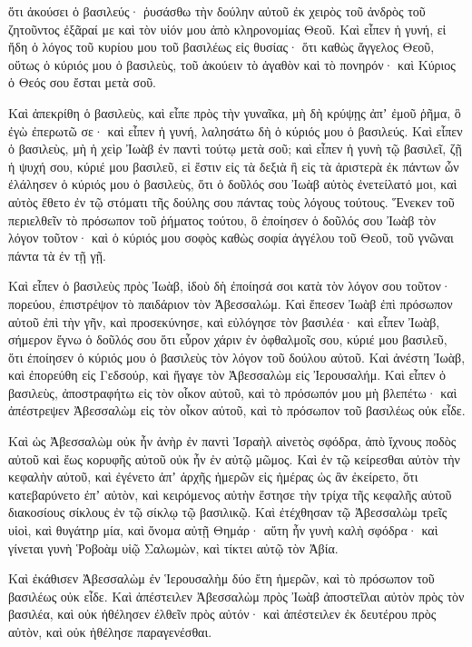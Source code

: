 {ὅτι ἀκούσει ὁ βασιλεύς· ῥυσάσθω τὴν δούλην αὐτοῦ ἐκ χειρὸς τοῦ ἀνδρὸς τοῦ ζητοῦντος ἐξᾶραί με καὶ τὸν υἱόν μου ἀπὸ κληρονομίας Θεοῦ.
Καὶ εἶπεν ἡ γυνή, εἰ ἤδη ὁ λόγος τοῦ κυρίου μου τοῦ βασιλέως εἰς θυσίας· ὅτι καθὼς ἄγγελος Θεοῦ, οὕτως ὁ κύριός μου ὁ βασιλεὺς, τοῦ ἀκούειν τὸ ἀγαθὸν καὶ τὸ πονηρόν· καὶ Κύριος ὁ Θεός σου ἔσται μετὰ σοῦ.
\par }{\PP {}Καὶ ἀπεκρίθη ὁ βασιλεὺς, καὶ εἶπε πρὸς τὴν γυναῖκα, μὴ δὴ κρύψῃς ἀπʼ ἐμοῦ ῥῆμα, ὃ ἐγὼ ἐπερωτῶ σε· καὶ εἶπεν ἡ γυνή, λαλησάτω δὴ ὁ κύριός μου ὁ βασιλεύς.
Καὶ εἶπεν ὁ βασιλεὺς, μὴ ἡ χεὶρ Ἰωὰβ ἐν παντὶ τούτῳ μετὰ σοῦ; καὶ εἶπεν ἡ γυνὴ τῷ βασιλεῖ, ζῇ ἡ ψυχή σου, κύριέ μου βασιλεῦ, εἰ ἔστιν εἰς τὰ δεξιὰ ἢ εἰς τὰ ἀριστερὰ ἐκ πάντων ὧν ἐλάλησεν ὁ κύριός μου ὁ βασιλεὺς, ὅτι ὁ δοῦλός σου Ἰωὰβ αὐτὸς ἐνετείλατό μοι, καὶ αὐτὸς ἔθετο ἐν τῷ στόματι τῆς δούλης σου πάντας τοὺς λόγους τούτους.
Ἕνεκεν τοῦ περιελθεῖν τὸ πρόσωπον τοῦ ῥήματος τούτου, ὃ ἐποίησεν ὁ δοῦλός σου Ἰωὰβ τὸν λόγον τοῦτον· καὶ ὁ κύριός μου σοφὸς καθὼς σοφία ἀγγέλου τοῦ Θεοῦ, τοῦ γνῶναι πάντα τὰ ἐν τῇ γῇ.
\par }{\PP {}Καὶ εἶπεν ὁ βασιλεὺς πρὸς Ἰωὰβ, ἰδοὺ δὴ ἐποίησά σοι κατὰ τὸν λόγον σου τοῦτον· πορεύου, ἐπιστρέψον τὸ παιδάριον τὸν Ἀβεσσαλώμ.
Καὶ ἔπεσεν Ἰωὰβ ἐπὶ πρόσωπον αὐτοῦ ἐπὶ τὴν γῆν, καὶ προσεκύνησε, καὶ εὐλόγησε τὸν βασιλέα· καὶ εἶπεν Ἰωὰβ, σήμερον ἔγνω ὁ δοῦλός σου ὅτι εὗρον χάριν ἐν ὀφθαλμοῖς σου, κύριέ μου βασιλεῦ, ὅτι ἐποίησεν ὁ κύριός μου ὁ βασιλεὺς τὸν λόγον τοῦ δούλου αὐτοῦ.
Καὶ ἀνέστη Ἰωὰβ, καὶ ἐπορεύθη εἰς Γεδσούρ, καὶ ἤγαγε τὸν Ἀβεσσαλὼμ εἰς Ἰερουσαλήμ.
Καὶ εἶπεν ὁ βασιλεὺς, ἀποστραφήτω εἰς τὸν οἶκον αὐτοῦ, καὶ τὸ πρόσωπόν μου μὴ βλεπέτω· καὶ ἀπέστρεψεν Ἀβεσσαλὼμ εἰς τὸν οἶκον αὐτοῦ, καὶ τὸ πρόσωπον τοῦ βασιλέως οὐκ εἶδε.
\par }{\PP {}Καὶ ὡς Ἀβεσσαλὼμ οὐκ ἦν ἀνὴρ ἐν παντὶ Ἰσραὴλ αἰνετὸς σφόδρα, ἀπὸ ἴχνους ποδὸς αὐτοῦ καὶ ἕως κορυφῆς αὐτοῦ οὐκ ἦν ἐν αὐτῷ μῶμος.
Καὶ ἐν τῷ κείρεσθαι αὐτὸν τὴν κεφαλὴν αὐτοῦ, καὶ ἐγένετο ἀπʼ ἀρχῆς ἡμερῶν εἰς ἡμέρας ὡς ἂν ἐκείρετο, ὅτι κατεβαρύνετο ἐπʼ αὐτὸν, καὶ κειρόμενος αὐτὴν ἔστησε τὴν τρίχα τῆς κεφαλῆς αὐτοῦ διακοσίους σίκλους ἐν τῷ σίκλῳ τῷ βασιλικῷ.
Καὶ ἐτέχθησαν τῷ Ἀβεσσαλὼμ τρεῖς υἱοὶ, καὶ θυγάτηρ μία, καὶ ὄνομα αὐτῇ Θημάρ· αὕτη ἦν γυνὴ καλὴ σφόδρα· καὶ γίνεται γυνὴ Ῥοβοὰμ υἱῷ Σαλωμὼν, καὶ τίκτει αὐτῷ τὸν Ἀβία.
\par }{\PP {}Καὶ ἐκάθισεν Ἀβεσσαλὼμ ἐν Ἱερουσαλὴμ δύο ἔτη ἡμερῶν, καὶ τὸ πρόσωπον τοῦ βασιλέως οὐκ εἶδε.
Καὶ ἀπέστειλεν Ἀβεσσαλὼμ πρὸς Ἰωὰβ ἀποστεῖλαι αὐτὸν πρὸς τὸν βασιλέα, καὶ οὐκ ἠθέλησεν ἐλθεῖν πρὸς αὐτόν· καὶ ἀπέστειλεν ἐκ δευτέρου πρὸς αὐτὸν, καὶ οὐκ ἠθέλησε παραγενέσθαι.
}

